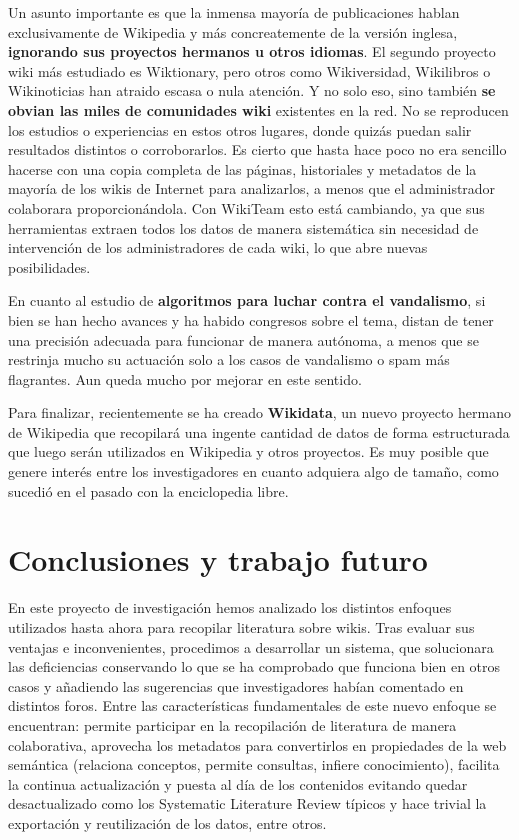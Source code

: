 \documentclass[11pt,onecolumn]{article}
\begin{document}
Un asunto importante es que la inmensa mayoría de publicaciones hablan exclusivamente de Wikipedia y más concreatemente de la versión inglesa, \textbf{ignorando sus proyectos hermanos u otros idiomas}. El segundo proyecto wiki más estudiado es Wiktionary, pero otros como Wikiversidad, Wikilibros o Wikinoticias han atraido escasa o nula atención. Y no solo eso, sino también \textbf{se obvian las miles de comunidades wiki} existentes en la red. No se reproducen los estudios o experiencias en estos otros lugares, donde quizás puedan salir resultados distintos o corroborarlos. Es cierto que hasta hace poco no era sencillo hacerse con una copia completa de las páginas, historiales y metadatos de la mayoría de los wikis de Internet para analizarlos, a menos que el administrador colaborara proporcionándola. Con WikiTeam esto está cambiando, ya que sus herramientas extraen todos los datos de manera sistemática sin necesidad de intervención de los administradores de cada wiki, lo que abre nuevas posibilidades.

En cuanto al estudio de \textbf{algoritmos para luchar contra el vandalismo}, si bien se han hecho avances y ha habido congresos sobre el tema, distan de tener una precisión adecuada para funcionar de manera autónoma, a menos que se restrinja mucho su actuación solo a los casos de vandalismo o spam más flagrantes. Aun queda mucho por mejorar en este sentido.

Para finalizar, recientemente se ha creado \textbf{Wikidata}, un nuevo proyecto hermano de Wikipedia que recopilará una ingente cantidad de datos de forma estructurada que luego serán utilizados en Wikipedia y otros proyectos. Es muy posible que genere interés entre los investigadores en cuanto adquiera algo de tamaño, como sucedió en el pasado con la enciclopedia libre.

\clearpage

\section{Conclusiones y trabajo futuro}


En este proyecto de investigación hemos analizado los distintos enfoques utilizados hasta ahora para recopilar literatura sobre wikis. Tras evaluar sus ventajas e inconvenientes, procedimos a desarrollar un sistema, que solucionara las deficiencias conservando lo que se ha comprobado que funciona bien en otros casos y añadiendo las sugerencias que investigadores habían comentado en distintos foros. Entre las características fundamentales de este nuevo enfoque se encuentran: permite participar en la recopilación de literatura de manera colaborativa, aprovecha los metadatos para convertirlos en propiedades de la web semántica (relaciona conceptos, permite consultas, infiere conocimiento), facilita la continua actualización y puesta al día de los contenidos evitando quedar desactualizado como los Systematic Literature Review típicos y hace trivial la exportación y reutilización de los datos, entre otros.
\end{document}

